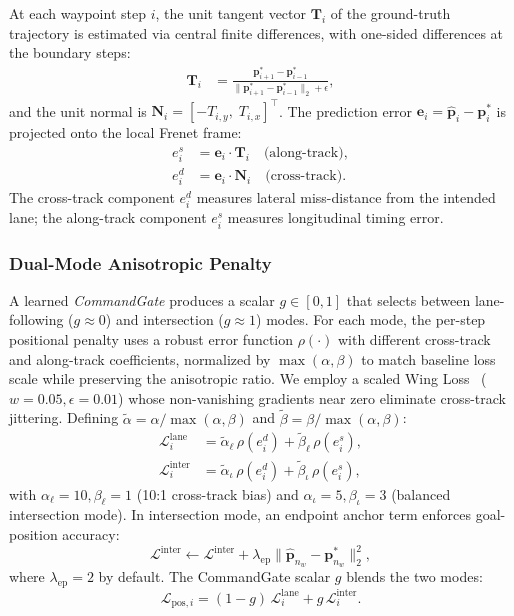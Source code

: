 At each waypoint step $i$, the unit tangent vector $\mathbf{T}_i$
of the ground-truth trajectory is estimated via central finite
differences, with one-sided differences at the boundary steps:
\begin{align}
  \mathbf{T}_i &=
    \frac{\mathbf{p}^*_{i+1} - \mathbf{p}^*_{i-1}}
         {\|\mathbf{p}^*_{i+1} - \mathbf{p}^*_{i-1}\|_2 + \epsilon},
  \label{eq:tangent}
\end{align}
and the unit normal is
$\mathbf{N}_i = [-T_{i,y},\;T_{i,x}]^\top$.
The prediction error
$\mathbf{e}_i = \hat{\mathbf{p}}_i - \mathbf{p}^*_i$
is projected onto the local Frenet frame:
\begin{align}
  e^s_i &= \mathbf{e}_i \cdot \mathbf{T}_i
           \quad \text{(along-track)}, \label{eq:es}\\
  e^d_i &= \mathbf{e}_i \cdot \mathbf{N}_i
           \quad \text{(cross-track)}. \label{eq:ed}
\end{align}
The cross-track component $e^d_i$ measures lateral miss-distance
from the intended lane; the along-track component $e^s_i$ measures
longitudinal timing error.

\subsubsection{Dual-Mode Anisotropic Penalty}

A learned \emph{CommandGate} produces a scalar $g\in[0,1]$ that
selects between lane-following ($g{\approx}0$) and intersection
($g{\approx}1$) modes.
For each mode, the per-step positional penalty uses a robust error function $\rho(\cdot)$ with different cross-track and along-track coefficients, normalized by $\max(\alpha,\beta)$ to match baseline loss scale while preserving the anisotropic ratio. We employ a scaled Wing Loss~\cite{b_wingloss} ($w{=}0.05, \epsilon{=}0.01$) whose non-vanishing gradients near zero eliminate cross-track jittering. Defining $\tilde{\alpha}{=}\alpha/\!\max(\alpha,\beta)$ and $\tilde{\beta}{=}\beta/\!\max(\alpha,\beta)$:
\begin{align}
  \mathcal{L}^{\mathrm{lane}}_i
    &= \tilde\alpha_\ell\,\rho(e^d_i) + \tilde\beta_\ell\,\rho(e^s_i),
  \label{eq:lane}\\
  \mathcal{L}^{\mathrm{inter}}_i
    &= \tilde\alpha_\iota\,\rho(e^d_i) + \tilde\beta_\iota\,\rho(e^s_i),
  \label{eq:inter}
\end{align}
with $\alpha_\ell{=}10,\beta_\ell{=}1$ (10:1 cross-track bias) and
$\alpha_\iota{=}5,\beta_\iota{=}3$ (balanced intersection mode).
In intersection mode, an endpoint anchor term enforces goal-position
accuracy:
\begin{equation}
  \mathcal{L}^{\mathrm{inter}}
    \leftarrow \mathcal{L}^{\mathrm{inter}}
    + \lambda_{\mathrm{ep}}
      \|\hat{\mathbf{p}}_{n_w} - \mathbf{p}^*_{n_w}\|_2^2,
  \label{eq:endpoint}
\end{equation}
where $\lambda_{\mathrm{ep}}{=}2$ by default.
The CommandGate scalar $g$ blends the two modes:
\begin{equation}
  \mathcal{L}_{\mathrm{pos},i}
    = (1{-}g)\,\mathcal{L}^{\mathrm{lane}}_i
    + g\,\mathcal{L}^{\mathrm{inter}}_i.
  \label{eq:pos}
\end{equation}

